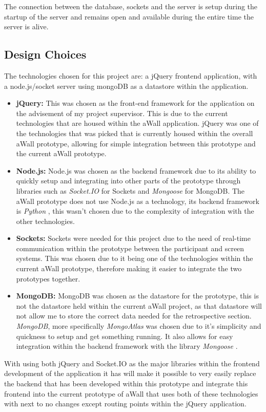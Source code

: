 \documentclass[11pt
              , a4paper
              , twoside
              , openright
              ]{report}
\begin{document}
The connection between the database, sockets and the server is setup during the startup of the server and remains open and available during the entire time the server is alive.

\subsection{Design Choices}
The technologies chosen for this project are: a jQuery frontend application, with a node.js/socket server using mongoDB as a datastore within the application. 
\begin{itemize}
	\item \textbf{jQuery:} \cite{js.foundation_2018}  This was chosen as the front-end framework for the application on the advisement of my project supervisor. This is due to the current technologies that are housed within the aWall application. jQuery was one of the technologies that was picked that is currently housed within the overall aWall prototype, allowing for simple integration between this prototype and the current aWall prototype. 
	\item \textbf{Node.js:} \cite{foundation_2018} Node.js was chosen as the backend framework due to its ability to quickly setup and integrating into other parts of the prototype through libraries such as \textit{Socket.IO} \cite{socket.io_2018} for Sockets and \textit{Mongoose} \cite{mongoose-odm-v5.1.3_2018} for MongoDB. The aWall prototype does not use Node.js as a technology, its backend framework is \textit{Python} \cite{welcome-to-python.org_2018}, this wasn't chosen due to the complexity of integration with the other technologies. 
	\item \textbf{Sockets:} \cite{socket.io_2018} Sockets were needed for this project due to the need of real-time communication within the prototype between the participant and screen systems. This was chosen due to it being one of the technologies within the current aWall prototype, therefore making it easier to integrate the two prototypes together.
	\item \textbf{MongoDB:} \cite{mongodb-for-giant-ideas_2018} MongoDB was chosen as the datastore for the prototype, this is not the datastore held within the current aWall project, as that datastore will not allow me to store the correct data needed for the retrospective section. \textit{MongoDB}, more specifically \textit{MongoAtlas} \cite{fully-managed-mongodb-hosted-on-aws-azure-and-gcp_2018} was chosen due to it's simplicity and quickness to setup and get something running. It also allows for easy integration within the backend framework with the library \textit{Mongoose} \cite{mongoose-odm-v5.1.3_2018}.
\end{itemize}
With using both jQuery and Socket.IO as the major libraries within the frontend development of the application it has will make it possible to very easily replace the backend that has been developed within this prototype and integrate this frontend into the current prototype of aWall that uses both of these technologies with next to no changes except routing points within the jQuery application.
\end{document}
